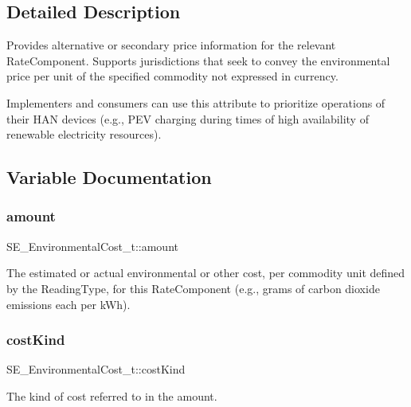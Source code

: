 \subsection{Detailed Description}
Provides alternative or secondary price information for the relevant Rate\+Component. Supports jurisdictions that seek to convey the environmental price per unit of the specified commodity not expressed in currency.

Implementers and consumers can use this attribute to prioritize operations of their H\+AN devices (e.\+g., P\+EV charging during times of high availability of renewable electricity resources). 

\subsection{Variable Documentation}
\mbox{\label{group__EnvironmentalCost_ga9fb61a220a4b7b3f677b34a19ddec1d2}} 
\subsubsection{\texorpdfstring{amount}{amount}}
{\footnotesize\ttfamily S\+E\+\_\+\+Environmental\+Cost\+\_\+t\+::amount}

The estimated or actual environmental or other cost, per commodity unit defined by the Reading\+Type, for this Rate\+Component (e.\+g., grams of carbon dioxide emissions each per k\+Wh). \mbox{\label{group__EnvironmentalCost_ga1aeeee701b58bf3a63ad13c43e7a75cd}} 
\subsubsection{\texorpdfstring{cost\+Kind}{costKind}}
{\footnotesize\ttfamily S\+E\+\_\+\+Environmental\+Cost\+\_\+t\+::cost\+Kind}

The kind of cost referred to in the amount. \mbox{\label{group__EnvironmentalCost_ga886bd3034acbc87051b648e6b2242453}} 
